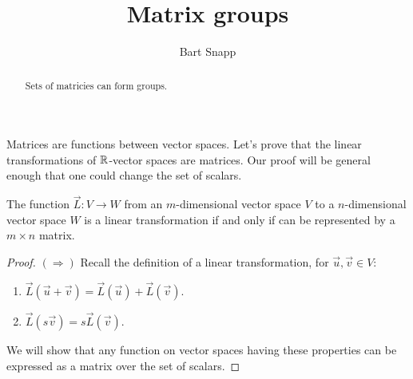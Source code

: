 \documentclass{ximera}
\author{Bart Snapp}
\title{Matrix groups}
\begin{document}
\begin{abstract}
  Sets of matricies can form groups.
\end{abstract}
\maketitle

Matrices are functions between vector spaces. Let's prove that the
linear transformations of $\mathbb R$-vector spaces are matrices. Our proof
will be general enough that one could change the set of scalars.

\begin{lemma}
  The function $\vec{L}: V \to W$ from an $m$-dimensional vector space
  $V$ to a $n$-dimensional vector space $W$ is a linear transformation
  if and only if can be represented by a $m\times n$ matrix.
  \begin{proof}
    $(\Rightarrow)$ Recall the definition of a linear transformation,
    for $\vec{u},\vec{v}\in V$:
    \begin{enumerate}
    \item $\vec{L}(\vec{u}+\vec{v}) = \vec{L}(\vec{u})+\vec{L}(\vec{v})$.
    \item $\vec{L}(s \vec{v}) = s\vec{L}(\vec{v})$.
    \end{enumerate}
    We will show that any function on vector spaces having these
    properties can be expressed as a matrix over the set of scalars.


\end{proof}
\end{lemma}
\end{document}
